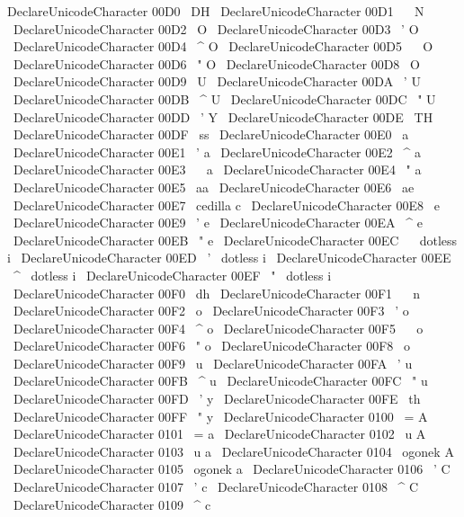 {{{{{DeclareUnicodeCharacter
{
00D0
}
{
\
DH
}
\
DeclareUnicodeCharacter
{
00D1
}
{
\
~
N
}
\
DeclareUnicodeCharacter
{
00D2
}
{
\
O
}
\
DeclareUnicodeCharacter
{
00D3
}
{
\
'
O
}
\
DeclareUnicodeCharacter
{
00D4
}
{
\
^
O
}
\
DeclareUnicodeCharacter
{
00D5
}
{
\
~
O
}
\
DeclareUnicodeCharacter
{
00D6
}
{
\
"
O
}
\
DeclareUnicodeCharacter
{
00D8
}
{
\
O
}
\
DeclareUnicodeCharacter
{
00D9
}
{
\
U
}
\
DeclareUnicodeCharacter
{
00DA
}
{
\
'
U
}
\
DeclareUnicodeCharacter
{
00DB
}
{
\
^
U
}
\
DeclareUnicodeCharacter
{
00DC
}
{
\
"
U
}
\
DeclareUnicodeCharacter
{
00DD
}
{
\
'
Y
}
\
DeclareUnicodeCharacter
{
00DE
}
{
\
TH
}
\
DeclareUnicodeCharacter
{
00DF
}
{
\
ss
}
\
DeclareUnicodeCharacter
{
00E0
}
{
\
a
}
\
DeclareUnicodeCharacter
{
00E1
}
{
\
'
a
}
\
DeclareUnicodeCharacter
{
00E2
}
{
\
^
a
}
\
DeclareUnicodeCharacter
{
00E3
}
{
\
~
a
}
\
DeclareUnicodeCharacter
{
00E4
}
{
\
"
a
}
\
DeclareUnicodeCharacter
{
00E5
}
{
\
aa
}
\
DeclareUnicodeCharacter
{
00E6
}
{
\
ae
}
\
DeclareUnicodeCharacter
{
00E7
}
{
\
cedilla
{
c
}
}
\
DeclareUnicodeCharacter
{
00E8
}
{
\
e
}
\
DeclareUnicodeCharacter
{
00E9
}
{
\
'
e
}
\
DeclareUnicodeCharacter
{
00EA
}
{
\
^
e
}
\
DeclareUnicodeCharacter
{
00EB
}
{
\
"
e
}
\
DeclareUnicodeCharacter
{
00EC
}
{
\
{
\
dotless
{
i
}
}
}
\
DeclareUnicodeCharacter
{
00ED
}
{
\
'
{
\
dotless
{
i
}
}
}
\
DeclareUnicodeCharacter
{
00EE
}
{
\
^
{
\
dotless
{
i
}
}
}
\
DeclareUnicodeCharacter
{
00EF
}
{
\
"
{
\
dotless
{
i
}
}
}
\
DeclareUnicodeCharacter
{
00F0
}
{
\
dh
}
\
DeclareUnicodeCharacter
{
00F1
}
{
\
~
n
}
\
DeclareUnicodeCharacter
{
00F2
}
{
\
o
}
\
DeclareUnicodeCharacter
{
00F3
}
{
\
'
o
}
\
DeclareUnicodeCharacter
{
00F4
}
{
\
^
o
}
\
DeclareUnicodeCharacter
{
00F5
}
{
\
~
o
}
\
DeclareUnicodeCharacter
{
00F6
}
{
\
"
o
}
\
DeclareUnicodeCharacter
{
00F8
}
{
\
o
}
\
DeclareUnicodeCharacter
{
00F9
}
{
\
u
}
\
DeclareUnicodeCharacter
{
00FA
}
{
\
'
u
}
\
DeclareUnicodeCharacter
{
00FB
}
{
\
^
u
}
\
DeclareUnicodeCharacter
{
00FC
}
{
\
"
u
}
\
DeclareUnicodeCharacter
{
00FD
}
{
\
'
y
}
\
DeclareUnicodeCharacter
{
00FE
}
{
\
th
}
\
DeclareUnicodeCharacter
{
00FF
}
{
\
"
y
}
\
DeclareUnicodeCharacter
{
0100
}
{
\
=
A
}
\
DeclareUnicodeCharacter
{
0101
}
{
\
=
a
}
\
DeclareUnicodeCharacter
{
0102
}
{
\
u
{
A
}
}
\
DeclareUnicodeCharacter
{
0103
}
{
\
u
{
a
}
}
\
DeclareUnicodeCharacter
{
0104
}
{
\
ogonek
{
A
}
}
\
DeclareUnicodeCharacter
{
0105
}
{
\
ogonek
{
a
}
}
\
DeclareUnicodeCharacter
{
0106
}
{
\
'
C
}
\
DeclareUnicodeCharacter
{
0107
}
{
\
'
c
}
\
DeclareUnicodeCharacter
{
0108
}
{
\
^
C
}
\
DeclareUnicodeCharacter
{
0109
}
{
\
^
c
}
}}}}}
